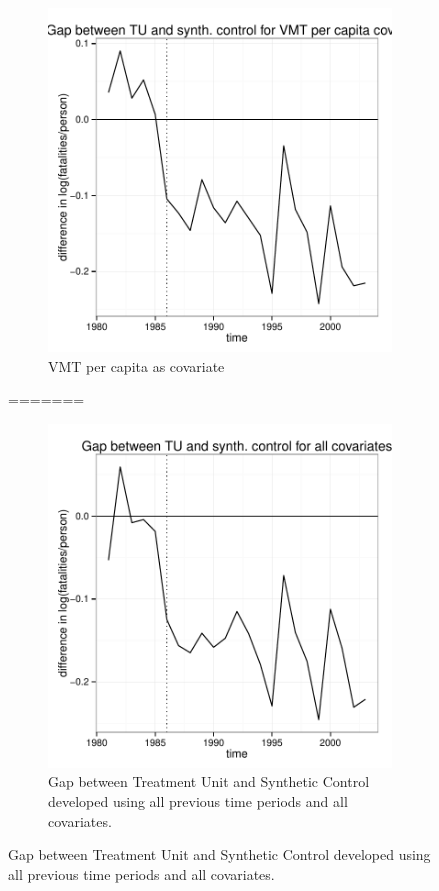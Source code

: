 \documentclass[letterpaper, 12pt]{article}
\begin{document}
\begin{figure}
\begin{centering}
    \begin{subfigure}[b]{\textwidth}
\includegraphics{img-gap-vmt.pdf}
      \caption{VMT per capita as covariate}
      \label{fig:c11c}
    \end{subfigure}
    \caption{Plots of gaps between Log(fatalities per capita) for synthetic control unit and treatment unit}\label{fig:c11}
\endgroup
=======
\begin{figure}[htbp]
\begin{center}
\includegraphics{img-gap-full.pdf}
\caption{Gap between Treatment Unit and Synthetic Control developed using all previous time periods and all covariates.}
\label{fig:c11}
\end{center}
\end{figure}


\end{centering}
\end{figure}
\end{document}

